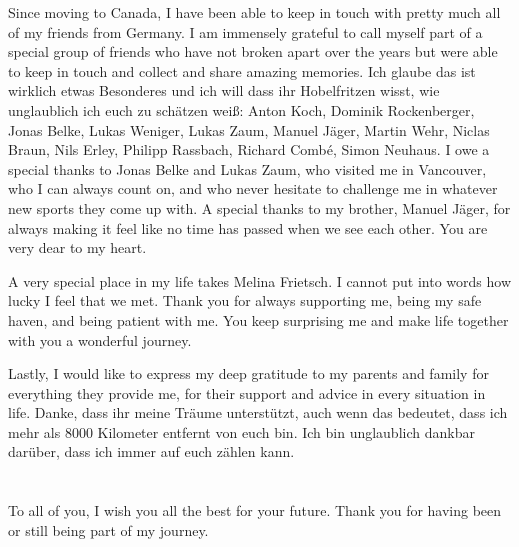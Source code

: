 Since moving to Canada, I have been able to keep in touch with pretty much all of my friends from Germany. 
I am immensely grateful to call myself part of a special group of friends who have not broken apart over the years but were able to keep in touch and collect and share amazing memories.
Ich glaube das ist wirklich etwas Besonderes und ich will dass ihr Hobelfritzen wisst, wie unglaublich ich euch zu schätzen weiß: 
Anton Koch, Dominik Rockenberger, Jonas Belke, Lukas Weniger, Lukas Zaum, Manuel Jäger, Martin Wehr, Niclas Braun, Nils Erley, Philipp Rassbach, Richard Combé, Simon Neuhaus.
I owe a special thanks to Jonas Belke and Lukas Zaum, who visited me in Vancouver, who I can always count on, and who never hesitate to challenge me in whatever new sports they come up with. 
A special thanks to my brother, Manuel Jäger, for always making it feel like no time has passed when we see each other. You are very dear to my heart. 

A very special place in my life takes Melina Frietsch. 
I cannot put into words how lucky I feel that we met.
Thank you for always supporting me, being my safe haven, and being patient with me. 
You keep surprising me and make life together with you a wonderful journey.

Lastly, I would like to express my deep gratitude to my parents and family for everything they provide me, for their support and advice in every situation in life. 
Danke, dass ihr meine Träume unterstützt, auch wenn das bedeutet, dass ich mehr als 8000 Kilometer entfernt von euch bin. 
Ich bin unglaublich dankbar darüber, dass ich immer auf euch zählen kann. 

\paragraph{}\mbox{}\\
To all of you, I wish you all the best for your future. 
Thank you for having been or still being part of my journey. 

